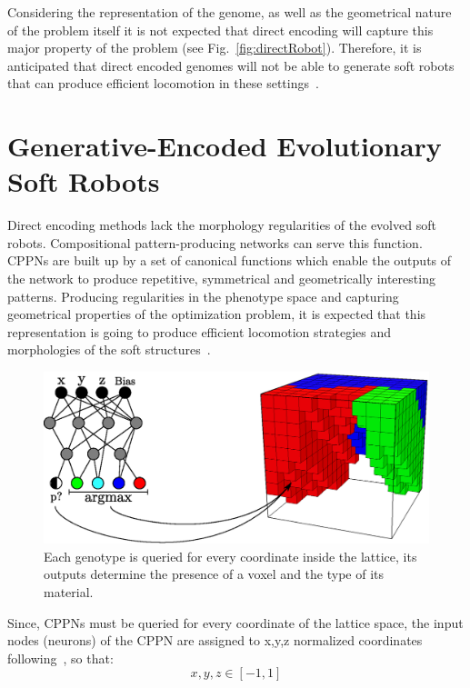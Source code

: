 Considering the representation of the genome, as well as the geometrical nature of the problem itself it is not expected that direct encoding will capture this major property of the problem (see Fig.~\ref{fig:directRobot}). Therefore, it is anticipated that direct encoded genomes will not be able to generate soft robots that can produce efficient locomotion in these settings~\citep{cheney2013unshackling}.





\section{Generative-Encoded Evolutionary Soft Robots}

Direct encoding methods lack the morphology regularities of the evolved soft robots. Compositional pattern-producing networks can serve this function. CPPNs are built up by a set of canonical functions which enable the outputs of the network to produce repetitive, symmetrical and geometrically interesting patterns. Producing regularities in the phenotype space and capturing geometrical properties of the optimization problem, it is expected that this representation is going to produce efficient locomotion strategies and morphologies of the soft structures~\citep{cheney2013unshackling}.
\begin{figure}
\centering
\includegraphics[height=0.2\textheight]{../Figures/Misc/cppnSoftBot.eps}
\caption{Each genotype is queried for every coordinate inside the lattice, its outputs determine the presence of a voxel and the type of its material.}
\label{fig:cppnDiagram}
\end{figure}
Since, CPPNs must be queried for every coordinate of the lattice space, the input nodes (neurons) of the CPPN are assigned to x,y,z normalized coordinates following~\citep{cheney2013unshackling}, so that:
\[x,y,z \in [-1,1]\]

